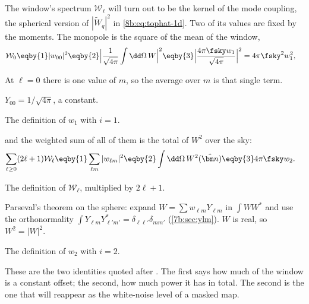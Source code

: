 The window's spectrum $\mathcal W_\ell$ will turn out to be the kernel of the mode coupling, the
spherical version of $|\tilde W_q|^2$ in \eqref{8b:eq:tophat-1d}. Two of its values are fixed by
the moments. The monopole is the square of the mean of the window,
\begin{align}
  \mathcal W_0
  &\eqby{1}|w_{00}|^2
   \eqby{2}\Bigl|\frac1{\sqrt{4\pi}}\int\dd\Omega\,W\Bigr|^2
   \eqby{3}\Bigl|\frac{4\pi\fsky w_1}{\sqrt{4\pi}}\Bigr|^2
   =4\pi\fsky^2w_1^2,
  \label{8b:eq:w0}
\end{align}
\begin{explain}
  \item At $\ell=0$ there is one value of $m$, so the average over $m$ is that single term.
  \item $Y_{00}=1/\sqrt{4\pi}$, a constant.
  \item The definition of $w_1$ with $i=1$.
\end{explain}
and the weighted sum of all of them is the total of $W^2$ over the sky:
\begin{align}
  \sum_{\ell\ge0}(2\ell+1)\mathcal W_\ell
  &\eqby{1}\sum_{\ell m}|w_{\ell m}|^2
   \eqby{2}\int\dd\Omega\,W^2(\hat{\bm n})
   \eqby{3}4\pi\fsky w_2 .
  \label{8b:eq:parseval}
\end{align}
\begin{explain}
  \item The definition of $\mathcal W_\ell$, multiplied by $2\ell+1$.
  \item Parseval's theorem on the sphere: expand $W=\sum w_{\ell m}Y_{\ell m}$ in $\int W W^*$ and use
        the orthonormality $\int Y_{\ell m}Y^*_{\ell'm'}=\delta_{\ell\ell'}\delta_{mm'}$ (\cref{7b:sec:ylm}). $W$ is real, so $W^2=|W|^2$.
  \item The definition of $w_2$ with $i=2$.
\end{explain}
These are the two identities quoted after . The first says how much of the
window is a constant offset; the second, how much power it has in total. The second is the one
that will reappear as the white-noise level of a masked map.

